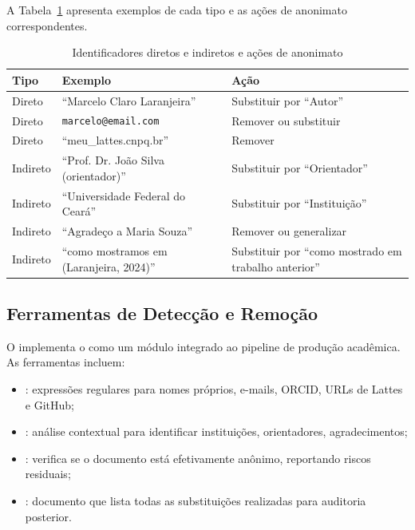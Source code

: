 A Tabela~\ref{tab:identificadores} apresenta exemplos de cada tipo e as ações
de anonimato correspondentes.

\begin{table}[htb]
\centering
\caption{Identificadores diretos e indiretos e ações de anonimato}
\label{tab:identificadores}
\begin{tabular}{lll}
\toprule
\textbf{Tipo} & \textbf{Exemplo} & \textbf{Ação} \\
\midrule
Direto & ``Marcelo Claro Laranjeira'' & Substituir por ``Autor'' \\
Direto & \texttt{marcelo@email.com} & Remover ou substituir \\
Direto & ``meu\_lattes.cnpq.br'' & Remover \\
Indireto & ``Prof. Dr. João Silva (orientador)'' & Substituir por ``Orientador'' \\
Indireto & ``Universidade Federal do Ceará'' & Substituir por ``Instituição'' \\
Indireto & ``Agradeço a Maria Souza'' & Remover ou generalizar \\
Indireto & ``como mostramos em (Laranjeira, 2024)'' & Substituir por ``como mostrado em trabalho anterior'' \\
\bottomrule
\end{tabular}
\end{table}

\subsection{Ferramentas de Detecção e Remoção}

O \opencodeeco{} implementa o  como um
módulo integrado ao pipeline de produção acadêmica. As ferramentas incluem:

\begin{itemize}
\item {}: expressões regulares
      para nomes próprios, e-mails, ORCID, URLs de Lattes e GitHub;
\item {}: análise contextual
      para identificar instituições, orientadores, agradecimentos;
\item {}: verifica se o documento está
      efetivamente anônimo, reportando riscos residuais;
\item {}: documento que lista todas as
      substituições realizadas para auditoria posterior.
\end{itemize}

